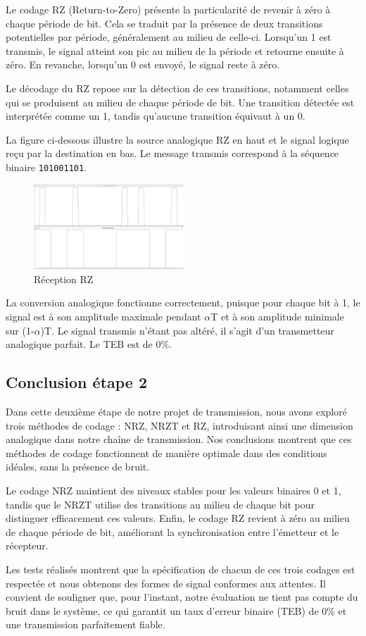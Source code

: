 Le codage RZ (Return-to-Zero) présente la particularité de revenir à zéro à chaque période de bit. Cela se traduit par la présence de deux transitions potentielles par période, généralement au milieu de celle-ci. Lorsqu'un 1 est transmis, le signal atteint son pic au milieu de la période et retourne ensuite à zéro. En revanche, lorsqu'un 0 est envoyé, le signal reste à zéro.

Le décodage du RZ repose sur la détection de ces transitions, notamment celles qui se produisent au milieu de chaque période de bit. Une transition détectée est interprétée comme un 1, tandis qu'aucune transition équivaut à un 0. 

La figure ci-dessous illustre la source analogique RZ en haut et le signal logique reçu par la destination en bas. Le message transmis correspond à la séquence binaire \texttt{101001101}.

\begin{figure}[H]
    \centering
    \includegraphics[width=0.5\textwidth]{img/etape2_reception_RZ.png}
    \caption{Réception RZ}
    \label{fig:reception_rz}
\end{figure}

La conversion analogique fonctionne correctement, puisque pour chaque bit à 1, le signal est à son amplitude maximale pendant $\alpha$T et à son amplitude minimale sur (1-$\alpha$)T. Le signal transmis n'étant pas altéré, il s'agit d'un transmetteur analogique parfait. Le TEB est de 0\%.

\subsection{Conclusion étape 2}

Dans cette deuxième étape de notre projet de transmission, nous avons exploré trois méthodes de codage : NRZ, NRZT et RZ, introduisant ainsi une dimension analogique dans notre chaîne de transmission. Nos conclusions montrent que ces méthodes de codage fonctionnent de manière optimale dans des conditions idéales, sans la présence de bruit. 

Le codage NRZ maintient des niveaux stables pour les valeurs binaires 0 et 1, tandis que le NRZT utilise des transitions au milieu de chaque bit pour distinguer efficacement ces valeurs. Enfin, le codage RZ revient à zéro au milieu de chaque période de bit, améliorant la synchronisation entre l'émetteur et le récepteur.

Les tests réalisés montrent que la spécification de chacun de ces trois codages est respectée et nous obtenons des formes de signal conformes aux attentes. Il convient de souligner que, pour l'instant, notre évaluation ne tient pas compte du bruit dans le système, ce qui garantit un taux d'erreur binaire (TEB) de 0\% et une transmission parfaitement fiable. 
